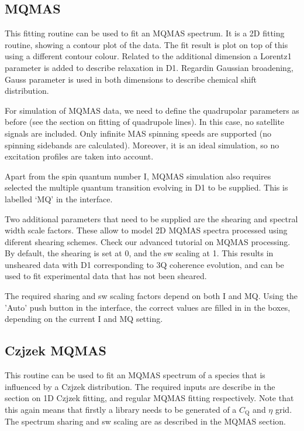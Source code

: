 \documentclass[11pt,a4paper]{article}
\begin{document}
\subsection{MQMAS}
This fitting routine can be used to fit an MQMAS spectrum. It is a 2D fitting routine, showing a contour plot 
of the data. The fit result is plot on top of this using a different contour colour. Related to the additional dimension
a Lorentz1 parameter is added to describe relaxation in D1. Regardin Gaussian broadening, Gauss parameter is used in 
both dimensions to describe chemical shift distribution.

For simulation of MQMAS data, we need to define the quadrupolar parameters as before (see the section on fitting 
of quadrupole lines). In this case, no satellite signals are included. Only infinite MAS spinning speeds are
 supported (no spinning sidebands are calculated). Moreover, it is an ideal simulation, so no excitation profiles 
are taken into account.

Apart from the spin quantum number I, MQMAS simulation also requires selected the multiple quantum transition 
evolving in D1 to be supplied. This is labelled `MQ' in the interface. 

Two additional parameters that need to be supplied are the shearing and spectral width scale factors. These allow 
to model 2D MQMAS spectra processed using diferent shearing schemes. Check our advanced tutorial on MQMAS processing. 
By default, the shearing is set at 0, and the sw scaling at 1. This results in unsheared data with D1 corresponding 
to 3Q coherence evolution, and can be used to fit experimental data that has not been sheared.

The required sharing and sw scaling factors depend on both I and MQ. Using the 'Auto' push button in the interface, 
the correct values are filled in in the boxes, depending on the current I and MQ setting.


\subsection{Czjzek MQMAS}
This routine can be used to fit an MQMAS spectrum of a species that is influenced by a Czjzek distribution. The 
required inputs are describe in the section on 1D Czjzek fitting, and regular MQMAS fitting respectively. Note 
that this again means that firstly a library needs to be generated of a $C_\text{Q}$ and $\eta$ grid. The spectrum 
sharing and sw scaling are as described in the MQMAS section.
\end{document}
